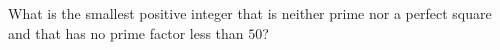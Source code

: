 What is the smallest positive integer that is neither prime nor a perfect square and that has no prime factor less than $50$?

